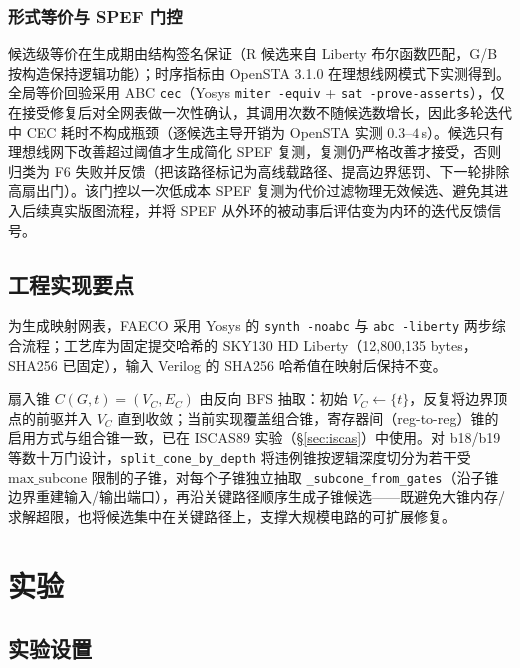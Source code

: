 \documentclass[journal]{IEEEtran}
\begin{document}
\subsubsection{形式等价与 SPEF 门控}
候选级等价在生成期由结构签名保证（R 候选来自 Liberty 布尔函数匹配，G/B 按构造保持逻辑功能）；时序指标由 OpenSTA 3.1.0 在理想线网模式下实测得到。全局等价回验采用 ABC \texttt{cec}（Yosys \texttt{miter -equiv} + \texttt{sat -prove-asserts}），仅在接受修复后对全网表做一次性确认，其调用次数不随候选数增长，因此多轮迭代中 CEC 耗时不构成瓶颈（逐候选主导开销为 OpenSTA 实测 $0.3$--$4\,$s）。候选只有理想线网下改善超过阈值才生成简化 SPEF 复测，复测仍严格改善才接受，否则归类为 F6 失败并反馈（把该路径标记为高线载路径、提高边界惩罚、下一轮排除高扇出门）。该门控以一次低成本 SPEF 复测为代价过滤物理无效候选、避免其进入后续真实版图流程，并将 SPEF 从外环的被动事后评估变为内环的迭代反馈信号。

\subsection{工程实现要点}\label{sec:impl}

为生成映射网表，FAECO 采用 Yosys 的 \texttt{synth -noabc} 与 \texttt{abc -liberty} 两步综合流程；工艺库为固定提交哈希的 SKY130 HD Liberty（12,800,135 bytes，SHA256 已固定），输入 Verilog 的 SHA256 哈希值在映射后保持不变。

扇入锥 $C(G, t) = (V_C, E_C)$ 由反向 BFS 抽取：初始 $V_C \leftarrow \{t\}$，反复将边界顶点的前驱并入 $V_C$ 直到收敛；当前实现覆盖组合锥，寄存器间（reg-to-reg）锥的启用方式与组合锥一致，已在 ISCAS89 实验（\S\ref{sec:iscas}）中使用。对 b18/b19 等数十万门设计，\texttt{split\_cone\_by\_depth} 将违例锥按逻辑深度切分为若干受 $\mathrm{max\_subcone}$ 限制的子锥，对每个子锥独立抽取 \texttt{\_subcone\_from\_gates}（沿子锥边界重建输入/输出端口），再沿关键路径顺序生成子锥候选——既避免大锥内存/求解超限，也将候选集中在关键路径上，支撑大规模电路的可扩展修复。

\section{实验}\label{sec:exp}

\subsection{实验设置}\label{sec:setup}
\end{document}
